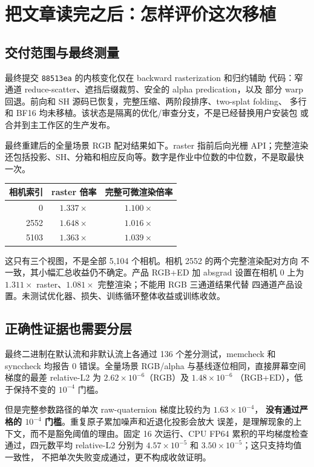\section{把文章读完之后：怎样评价这次移植}

\subsection{交付范围与最终测量}

最终提交 \texttt{88513ea} 的内核变化仅在 backward rasterization 和归约辅助
代码：窄通道 reduce-scatter、遮挡后缀裁剪、安全的 alpha predication，以及
部分 warp 回退。前向和 SH 源码已恢复，完整压缩、两阶段排序、two-splat folding、
多行和 BF16 均未移植。该状态是隔离的优化/审查分支，不是已经替换用户安装包
或合并到主工作区的生产发布。

最终重建后的全量场景 RGB 配对结果如下。raster 指前后向光栅 API；完整渲染
还包括投影、SH、分箱和相应反向等。数字是作业中位数的中位数，不是取最快一次。

\begin{center}
\begin{tabular}{rcc}
\hline
相机索引 & raster 倍率 & 完整可微渲染倍率 \\
\hline
0    & $1.337\times$ & $1.100\times$ \\
2552 & $1.648\times$ & $1.016\times$ \\
5103 & $1.363\times$ & $1.039\times$ \\
\hline
\end{tabular}
\end{center}

这只有三个视图，不是全部 5,104 个相机。相机 2552 的两个完整渲染配对方向
不一致，其小幅汇总收益仍不确定。产品 RGB+ED 加 absgrad 设置在相机 0 上为
$1.311\times$ raster、$1.081\times$ 完整渲染；不能用 RGB 三通道结果代替
四通道产品设置。未测试优化器、损失、训练循环整体收益或训练收敛。

\subsection{正确性证据也需要分层}

最终二进制在默认流和非默认流上各通过 136 个差分测试，memcheck 和 synccheck
均报告 0 错误。全量场景 RGB/alpha 与基线逐位相同，直接屏幕空间梯度的最差
relative-L2 为 $2.62\times10^{-6}$（RGB）及 $1.48\times10^{-6}$
（RGB+ED），低于保持不变的 $10^{-4}$ 门槛。

但是完整参数路径的单次 raw-quaternion 梯度比较约为 $1.63\times10^{-4}$，
\textbf{没有通过严格的 $10^{-4}$ 门槛}。重复原子累加噪声和近退化投影会放大
误差，是理解现象的上下文，而不是豁免阈值的理由。固定 16 次运行、CPU FP64
累积的平均梯度检查通过，四元数平均 relative-L2 分别为
$4.57\times10^{-5}$ 和 $3.50\times10^{-5}$；这只支持均值一致性，
不把单次失败变成通过，更不构成收敛证明。

